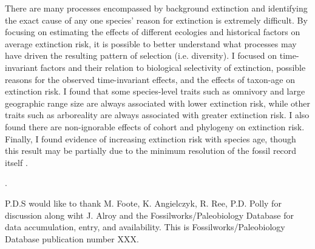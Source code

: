 \documentclass[12pt]{article}
\newcounter{lastnote}
\newenvironment{scilastnote}{%
\setcounter{lastnote}{\value{enumiv}}%
\addtocounter{lastnote}{+1}%
\begin{list}%
{\arabic{lastnote}.}
{\setlength{\leftmargin}{.22in}}
{\setlength{\labelsep}{.5em}}}
{\end{list}}
\begin{document}
There are many processes encompassed by background extinction and identifying the exact cause of any one species' reason for extinction is extremely difficult. By focusing on estimating the effects of different ecologies and historical factors on average extinction risk, it is possible to better understand what processes may have driven the resulting pattern of selection (i.e. diversity). I focused on time-invariant factors and their relation to biological selectivity of extinction, possible reasons for the observed time-invariant effects, and the effects of taxon-age on extinction risk. I found that some species-level traits such as omnivory and large geographic range size are always associated with lower extinction risk, while other traits such as arboreality are always associated with greater extinction risk. I also found there are non-ignorable effects of cohort and phylogeny on extinction risk. Finally, I found evidence of increasing extinction risk with species age, though this result may be partially due to the minimum resolution of the fossil record itself \cite{Sepkoski1975}.





\begin{scilastnote}
\item P.D.S would like to thank M. Foote, K. Angielczyk, R. Ree, P.D. Polly for discussion along wiht J. Alroy and the Fossilworks/Paleobiology Database for data accumulation, entry, and availability. This is Fossilworks/Paleobiology Database publication number XXX.
\end{scilastnote}


\end{document}
